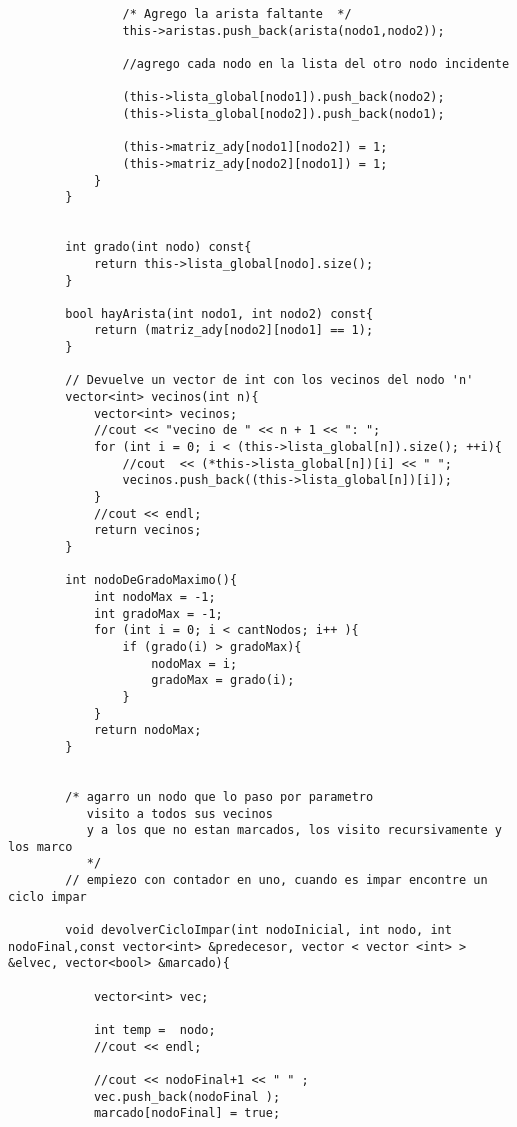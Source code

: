 \begin{lstlisting}
                /* Agrego la arista faltante  */
                this->aristas.push_back(arista(nodo1,nodo2));

                //agrego cada nodo en la lista del otro nodo incidente

                (this->lista_global[nodo1]).push_back(nodo2);
                (this->lista_global[nodo2]).push_back(nodo1);

                (this->matriz_ady[nodo1][nodo2]) = 1;
                (this->matriz_ady[nodo2][nodo1]) = 1;
            }
        }


        int grado(int nodo) const{
            return this->lista_global[nodo].size();
        }

        bool hayArista(int nodo1, int nodo2) const{
            return (matriz_ady[nodo2][nodo1] == 1);
        }

        // Devuelve un vector de int con los vecinos del nodo 'n'
        vector<int> vecinos(int n){
            vector<int> vecinos;
            //cout << "vecino de " << n + 1 << ": ";
            for (int i = 0; i < (this->lista_global[n]).size(); ++i){
                //cout  << (*this->lista_global[n])[i] << " ";
                vecinos.push_back((this->lista_global[n])[i]);
            }
            //cout << endl;
            return vecinos;
        }

        int nodoDeGradoMaximo(){
            int nodoMax = -1;
            int gradoMax = -1;
            for (int i = 0; i < cantNodos; i++ ){
                if (grado(i) > gradoMax){
                    nodoMax = i;
                    gradoMax = grado(i);
                }
            }
            return nodoMax;
        }


        /* agarro un nodo que lo paso por parametro
           visito a todos sus vecinos
           y a los que no estan marcados, los visito recursivamente y los marco
           */
        // empiezo con contador en uno, cuando es impar encontre un ciclo impar

        void devolverCicloImpar(int nodoInicial, int nodo, int nodoFinal,const vector<int> &predecesor, vector < vector <int> > &elvec, vector<bool> &marcado){

            vector<int> vec;

            int temp =  nodo;
            //cout << endl;

            //cout << nodoFinal+1 << " " ;
            vec.push_back(nodoFinal );
            marcado[nodoFinal] = true;


\end{lstlisting}
